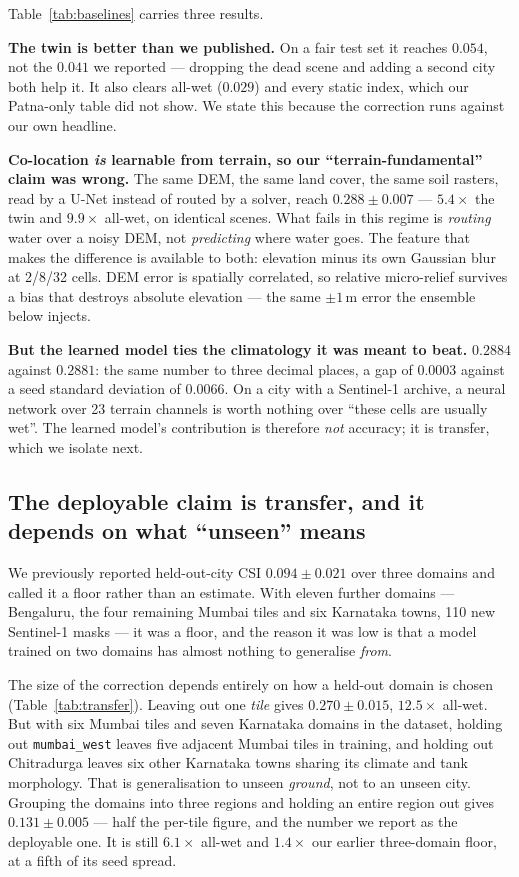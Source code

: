 \documentclass[10pt]{article}
\begin{document}
Table~\ref{tab:baselines} carries three results.

\textbf{The twin is better than we published.} On a fair test set it reaches $0.054$, not the
$0.041$ we reported --- dropping the dead scene and adding a second city both help it. It also
clears all-wet ($0.029$) and every static index, which our Patna-only table did not show. We
state this because the correction runs against our own headline.

\textbf{Co-location \emph{is} learnable from terrain, so our ``terrain-fundamental'' claim was
wrong.} The same DEM, the same land cover, the same soil rasters, read by a U-Net instead of
routed by a solver, reach $0.288\pm0.007$ --- $5.4\times$ the twin and $9.9\times$ all-wet, on
identical scenes. What fails in this regime is \emph{routing} water over a noisy DEM, not
\emph{predicting} where water goes. The feature that makes the difference is available to both:
elevation minus its own Gaussian blur at 2/8/32 cells. DEM error is spatially correlated, so
relative micro-relief survives a bias that destroys absolute elevation --- the same $\pm1$\,m
error the ensemble below injects.

\textbf{But the learned model ties the climatology it was meant to beat.} $0.2884$ against
$0.2881$: the same number to three decimal places, a gap of $0.0003$ against a seed
standard deviation of $0.0066$. On a city with a
Sentinel-1 archive, a neural network over 23 terrain channels is worth nothing over ``these cells
are usually wet''. The learned model's contribution is therefore \emph{not} accuracy; it is
transfer, which we isolate next.

\subsection{The deployable claim is transfer, and it depends on what ``unseen'' means}
We previously reported held-out-city CSI $0.094\pm0.021$ over three domains and called it a floor
rather than an estimate. With eleven further domains --- Bengaluru, the four remaining Mumbai
tiles and six Karnataka towns, 110 new Sentinel-1 masks --- it was a floor, and the reason it was
low is that a model trained on two domains has almost nothing to generalise \emph{from}.

The size of the correction depends entirely on how a held-out domain is chosen
(Table~\ref{tab:transfer}). Leaving out one \emph{tile} gives $0.270\pm0.015$, $12.5\times$
all-wet. But with six Mumbai tiles and seven Karnataka domains in the dataset, holding out
\texttt{mumbai\_west} leaves five adjacent Mumbai tiles in training, and holding out Chitradurga
leaves six other Karnataka towns sharing its climate and tank morphology. That is generalisation
to unseen \emph{ground}, not to an unseen city. Grouping the domains into three regions and
holding an entire region out gives $0.131\pm0.005$ --- half the per-tile figure, and the number
we report as the deployable one. It is still $6.1\times$ all-wet and $1.4\times$ our earlier
three-domain floor, at a fifth of its seed spread.
\end{document}
